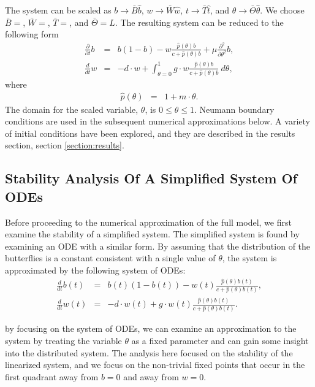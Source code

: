 \documentclass[12pt]{article}
\begin{document}
The system can be scaled as $b\rightarrow \bar{B}\hat{b}$,
$w\rightarrow \bar{W}\hat{w}$, $t\rightarrow \bar{T}\hat{t}$, and
$\theta\rightarrow \bar{\Theta}\hat{\theta}$. We choose $\bar{B}=$,
$\bar{W}=$, $\bar{T}=$, and $\bar{\Theta}=L$. The resulting system
can be reduced to the following form
\begin{eqnarray}
  \label{eq:scaledodePDE1}
  \frac{\partial}{\partial t} b & = &
      b (1 - b)
      -  w \frac{\hat{p}(\theta) b}{c+\hat{p}(\theta)b}
      + \mu \frac{\partial^2}{\partial \theta^2} b , \\
  \label{eq:scaledodePDE2}
  \frac{d}{dt} w & = & -d \cdot w +
      \int^1_{\theta=0} g \cdot w \frac{\hat{p}(\theta) b }{c + \hat{p}(\theta) b} ~ d\theta,
\end{eqnarray}
where
\begin{eqnarray}
  \hat{p}(\theta) & = & 1 + m \cdot \theta.
\end{eqnarray}
The domain for the scaled variable, $\theta$, is $0\leq\theta\leq 1$.
Neumann boundary conditions are used in the subsequent numerical
approximations below. A variety of initial conditions have been
explored, and they are described in the results section, section
\ref{section:results}.


\subsection{Stability Analysis Of A Simplified System Of ODEs}

Before proceeding to the numerical approximation of the full model, we
first examine the stability of a simplified system. The simplified
system is found by examining an ODE with a similar form. By assuming
that the distribution of the butterflies is a constant consistent with
a single value of $\theta$, the system is approximated by the
following system of ODEs:
\begin{eqnarray}
  \label{eq:scaledODE1}
  \frac{d}{dt} b(t) & = &
      b(t) (1 - b(t))
      -  w(t) \frac{\hat{p}(\theta) b(t)}{c+\hat{p}(\theta)b(t)}, \\
  \label{eq:scaledODE2}
  \frac{d}{dt} w(t) & = & -d \cdot w(t) +
       g \cdot w(t) \frac{\hat{p}(\theta) b(t) }{c + \hat{p}(\theta) b(t)}.
\end{eqnarray}

by focusing on the system of ODEs, we can examine an approximation to
the system by treating the variable $\theta$ as a fixed parameter and
can gain some insight into the distributed system. The analysis here
focused on the stability of the linearized system, and we focus on the
non-trivial fixed points that occur in the first quadrant away from
$b=0$ and away from $w=0$.
\end{document}
